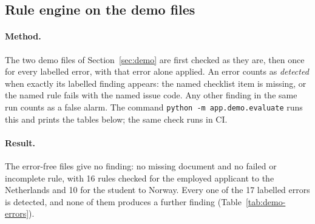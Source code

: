 \subsection{Rule engine on the demo files}\label{sec:demo-eval}
\paragraph{Method.} The two demo files of Section~\ref{sec:demo} are first checked as they are,
then once for every labelled error, with that error alone applied. An error counts as
\emph{detected} when exactly its labelled finding appears: the named checklist item is missing, or
the named rule fails with the named issue code. Any other finding in the same run counts as a
false alarm. The command \texttt{python -m app.demo.evaluate} runs this and prints the tables below;
the same check runs in CI.

\paragraph{Result.} The error-free files give no finding: no missing document and no failed or
incomplete rule, with 16 rules checked for the employed applicant to the Netherlands and 10 for the
student to Norway. Every one of the 17 labelled errors is detected, and none of them produces a
further finding (Table~\ref{tab:demo-errors}).

